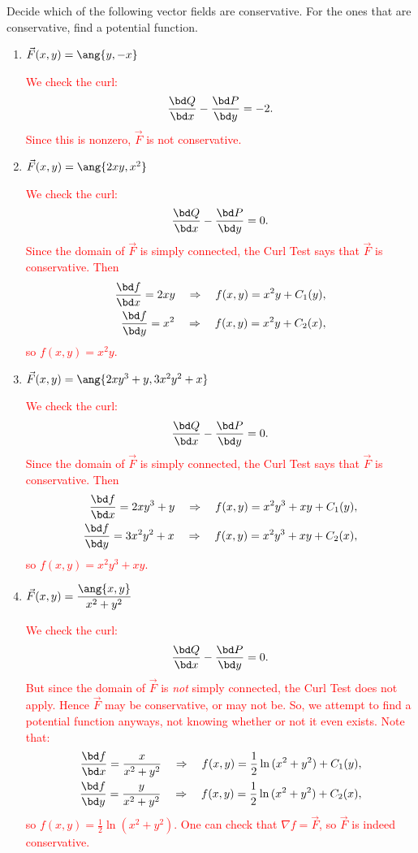 \documentclass[12pt,reqno]{amsart}
\begin{document}
\newpage
\prob Decide which of the following vector fields are conservative. For the ones that are conservative, find a potential function.

\medskip
\begin{enumerate}
\item $\vec{F}(x,y) = \ang{y,-x}$

\bigskip
\textcolor{red}{We check the curl:
	\[\frac{\bd Q}{\bd x} - \frac{\bd P}{\bd y} = -2.
	\]
Since this is nonzero, $\vec{F}$ is not conservative.}
\bigskip

\item $\vec{F}(x,y) = \ang{2xy,x^2}$

\bigskip
\textcolor{red}{We check the curl:
	\[\frac{\bd Q}{\bd x} - \frac{\bd P}{\bd y} = 0.
	\]
Since the domain of $\vec{F}$ is simply connected, the Curl Test says that $\vec{F}$ is conservative. Then
\begin{align*}
\frac{\bd f}{\bd x} = 2xy \quad \Rightarrow \quad f(x,y) = x^2y + C_1(y), \\
\frac{\bd f}{\bd y} = x^2 \quad \Rightarrow \quad f(x,y) = x^2y + C_2(x),
\end{align*}
so $f(x,y) = x^2y$.}
\bigskip

\item $\vec{F}(x,y) = \ang{2xy^3+y,3x^2y^2+x}$

\bigskip
\textcolor{red}{We check the curl:
	\[\frac{\bd Q}{\bd x} - \frac{\bd P}{\bd y} = 0.
	\]
Since the domain of $\vec{F}$ is simply connected, the Curl Test says that $\vec{F}$ is conservative. Then
\begin{align*}
\frac{\bd f}{\bd x} = 2xy^3+y \quad \Rightarrow \quad f(x,y) = x^2y^3 + xy + C_1(y), \\
\frac{\bd f}{\bd y} = 3x^2y^2+x \quad \Rightarrow \quad f(x,y) = x^2y^3 + xy + C_2(x),
\end{align*}
so $f(x,y) = x^2y^3+xy$.}
\bigskip

\item $\vec{F}(x,y) =\displaystyle \frac{\ang{x,y}}{x^2+y^2}$

\bigskip
\textcolor{red}{We check the curl:
	\[\frac{\bd Q}{\bd x} - \frac{\bd P}{\bd y} = 0.
	\]
But since the domain of $\vec{F}$ is \textit{not} simply connected, the Curl Test does not apply. Hence $\vec{F}$ may be conservative, or may not be. So, we attempt to find a potential function anyways, not knowing whether or not it even exists. Note that:
\begin{align*}
\frac{\bd f}{\bd x} = \frac{x}{x^2+y^2} \quad \Rightarrow \quad f(x,y) = \frac{1}{2} \ln{(x^2+y^2)} + C_1(y), \\
\frac{\bd f}{\bd y} = \frac{y}{x^2+y^2} \quad \Rightarrow \quad f(x,y) = \frac{1}{2} \ln{(x^2+y^2)} + C_2(x),
\end{align*}
so $f(x,y) = \frac{1}{2} \ln{(x^2+y^2)}$. One can check that $\nabla f = \vec{F}$, so $\vec{F}$ is indeed conservative.}
\bigskip

\end{enumerate}
\end{document}
